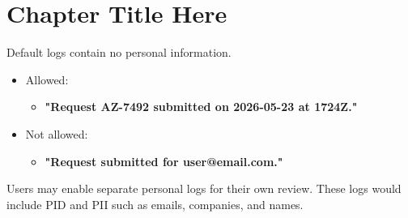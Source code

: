 
\chapter{Chapter Title Here}

Default logs contain no personal information.
\begin{itemize}
	\item[] Allowed:
	\begin{itemize}
		\item[] \textbf{"Request AZ-7492 submitted on 2026-05-23 at 1724Z."}
	\end{itemize}
	\item[] Not allowed:
	\begin{itemize}
		\item[] \textbf{"Request submitted for user@email.com."}
	\end{itemize}

\end{itemize}

Users may enable separate personal logs for their own review. These logs would include PID and PII such as emails, companies, and names.


\sentinelchapterend
